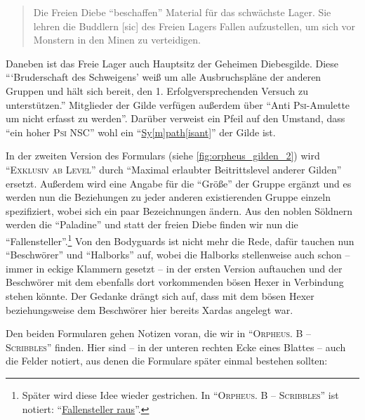 \documentclass[a5paper,pagesize,numbers=noenddot]{scrbook}
\begin{document}
\begin{quote}
   Die Freien Diebe \enquote{beschaffen} Material für das schwächste Lager.
   Sie lehren die Buddlern [sic] des Freien Lagers Fallen aufzustellen, um sich vor Monstern in den Minen zu verteidigen.
\end{quote}

Daneben ist das Freie Lager auch Hauptsitz der Geheimen Diebesgilde.
Diese \enquote{\enquote{Bruderschaft des Schweigens} weiß um alle Ausbruchspläne der anderen Gruppen und hält sich bereit, den 1. Erfolgversprechenden Versuch zu unterstützen.}
Mitglieder der Gilde verfügen außerdem über \enquote{Anti \textsc{Psi}-Amulette um nicht erfasst zu werden}.
Darüber verweist ein Pfeil auf den Umstand, dass \enquote{ein hoher \textsc{Psi} NSC} wohl ein \enquote{\uline{Sy[m]path[isant]}} der Gilde ist.

In der zweiten Version des Formulars (siehe \autoref{fig:orpheus_gilden_2}) wird \enquote{\textsc{Exklusiv ab Level}} durch \enquote{Maximal erlaubter Beitrittslevel anderer Gilden} ersetzt.
Außerdem wird eine Angabe für die \enquote{Größe} der Gruppe ergänzt und es werden nun die Beziehungen zu jeder anderen existierenden Gruppe einzeln spezifiziert, wobei sich ein paar Bezeichnungen ändern.
Aus den noblen Söldnern werden die \enquote{Paladine} und statt der freien Diebe finden wir nun die \enquote{Fallensteller}.\footnote{Später wird diese Idee wieder gestrichen.
In \enquote{\textsc{Orpheus. B -- Scribbles}} ist notiert:
\enquote{\uline{Fallensteller raus}}.}
Von den Bodyguards ist nicht mehr die Rede, dafür tauchen nun \enquote{Beschwörer} und \enquote{Halborks} auf, wobei die Halborks stellenweise auch schon -- immer in eckige Klammern gesetzt -- in der ersten Version auftauchen und der Beschwörer mit dem ebenfalls dort vorkommenden bösen Hexer in Verbindung stehen könnte.
Der Gedanke drängt sich auf, dass mit dem bösen Hexer beziehungsweise dem Beschwörer hier bereits Xardas angelegt war.

Den beiden Formularen gehen Notizen voran, die wir in \enquote{\textsc{Orpheus. B -- Scribbles}} finden.\autocite[Vgl.][S.~13--15]{orpheus_b_scribbles}
Hier sind -- in der unteren rechten Ecke eines Blattes -- auch die Felder notiert, aus denen die Formulare später einmal bestehen sollten:
\end{document}
